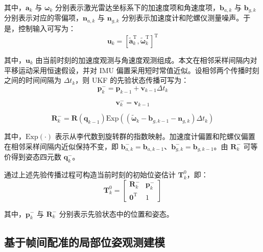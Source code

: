 其中，$\mathbf{a}_{k}$ 与 $\boldsymbol{\omega}_{k}$ 分别表示激光雷达坐标系下的加速度项和角速度项，$\mathbf{b}_{a,k}$ 与 $\mathbf{b}_{g,k}$ 分别表示对应的零偏项，$\mathbf{n}_{a,k}$ 与 $\mathbf{n}_{g,k}$ 分别表示加速度计和陀螺仪测量噪声。于是，控制输入可写为：
\begin{equation}
\mathbf{u}_{k}
=
\left[
\tilde{\mathbf{a}}_{k}^{\mathrm{T}},
\tilde{\boldsymbol{\omega}}_{k}^{\mathrm{T}}
\right]^{\mathrm{T}}
\end{equation}

其中，$\mathbf{u}_{k}$ 由当前时刻的加速度观测与角速度观测组成。本文在相邻采样间隔内对平移运动采用恒速假设，并对 IMU 偏置采用短时常值近似。设相邻两个传播时刻之间的时间间隔为 $\Delta t_k$，则 UKF 的先验状态传播可写为：
\begin{equation}
\mathbf{p}_{k}^{-}
=
\mathbf{p}_{k-1}
+\mathbf{v}_{k-1}\Delta t_k
\end{equation}

\begin{equation}
\mathbf{v}_{k}^{-}
=
\mathbf{v}_{k-1}
\end{equation}

\begin{equation}
\mathbf{R}_{k}^{-}
=
\mathbf{R}\left(\mathbf{q}_{k-1}\right)
\mathrm{Exp}
\left(
\left(
\tilde{\boldsymbol{\omega}}_{k}-\mathbf{b}_{g,k-1}-\mathbf{n}_{g,k}
\right)
\Delta t_k
\right)
\end{equation}

其中，$\mathrm{Exp}(\cdot)$ 表示从李代数到旋转群的指数映射。加速度计偏置和陀螺仪偏置在相邻采样间隔内近似保持不变，即 $\mathbf{b}_{a,k}^{-}=\mathbf{b}_{a,k-1}$、$\mathbf{b}_{g,k}^{-}=\mathbf{b}_{g,k-1}$。由 $\mathbf{R}_{k}^{-}$ 可等价得到姿态四元数 $\mathbf{q}_{k}^{-}$。

通过上述先验传播过程可构造当前时刻的初始位姿估计 $\mathbf{T}_{k}^{0}$，即：
\begin{equation}
\mathbf{T}_{k}^{0}=
\begin{bmatrix}
\mathbf{R}_{k}^{-} & \mathbf{p}_{k}^{-}\\
\mathbf{0}^{\mathrm{T}} & 1
\end{bmatrix}
\end{equation}

其中，$\mathbf{p}_{k}^{-}$ 与 $\mathbf{R}_{k}^{-}$ 分别表示先验状态中的位置和姿态。

\subsection{基于帧间配准的局部位姿观测建模}

